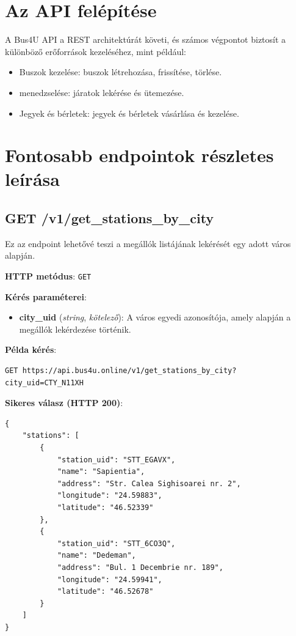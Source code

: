 \section{Az API felépítése}
A Bus4U API a REST architektúrát követi, és számos végpontot biztosít a különböző erőforrások kezeléséhez, mint például:
\begin{itemize}
    \item Buszok kezelése: buszok létrehozása, frissítése, törlése.
    \item  menedzselése: járatok lekérése és ütemezése.
    \item Jegyek és bérletek: jegyek és bérletek vásárlása és kezelése.
\end{itemize}

\section{Fontosabb endpointok részletes leírása}

\subsection{GET /v1/get\_stations\_by\_city}
Ez az endpoint lehetővé teszi a megállók listájának lekérését egy adott város alapján.

\textbf{HTTP metódus}: \verb|GET|

\textbf{Kérés paraméterei}:
\begin{itemize}
    \item \textbf{city\_uid} (\textit{string}, \textit{kötelező}): A város egyedi azonosítója, amely alapján a megállók lekérdezése történik.
\end{itemize}

\textbf{Példa kérés}:
\begin{verbatim}
GET https://api.bus4u.online/v1/get_stations_by_city?city_uid=CTY_N11XH
\end{verbatim}

\textbf{Sikeres válasz (HTTP 200)}:
\begin{verbatim}
{
    "stations": [
        {
            "station_uid": "STT_EGAVX",
            "name": "Sapientia",
            "address": "Str. Calea Sighisoarei nr. 2",
            "longitude": "24.59883",
            "latitude": "46.52339"
        },
        {
            "station_uid": "STT_6CO3Q",
            "name": "Dedeman",
            "address": "Bul. 1 Decembrie nr. 189",
            "longitude": "24.59941",
            "latitude": "46.52678"
        }
    ]
}
\end{verbatim}

